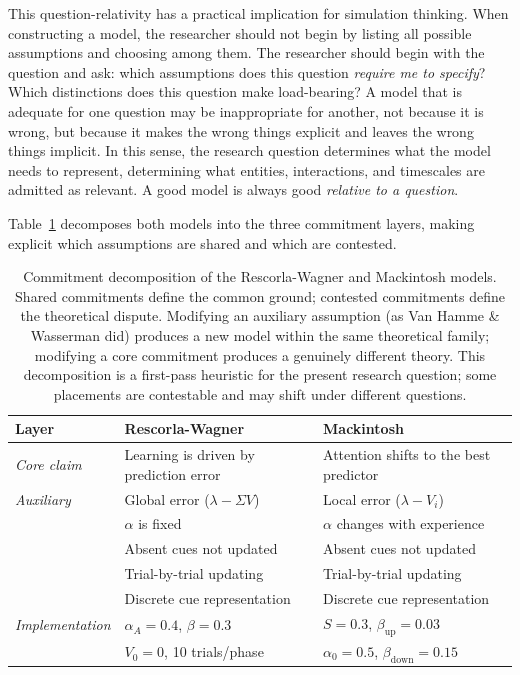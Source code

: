 \documentclass[fleqn,10pt]{wlscirep}
\begin{document}
\begin{linenumbers}
This question-relativity has a practical implication for simulation thinking. When constructing a model, the researcher should not begin by listing all possible assumptions and choosing among them. The researcher should begin with the question and ask: which assumptions does this question \emph{require me to specify}? Which distinctions does this question make load-bearing? A model that is adequate for one question may be inappropriate for another, not because it is wrong, but because it makes the wrong things explicit and leaves the wrong things implicit. In this sense, the research question determines what the model needs to represent, determining what entities, interactions, and timescales are admitted as relevant. A good model is always good \emph{relative to a question}.

Table~\ref{tab:commitments} decomposes both models into the three commitment layers, making explicit which assumptions are shared and which are contested.

\begin{table}[t]
\centering
\small
\caption{Commitment decomposition of the Rescorla-Wagner and Mackintosh models. Shared commitments define the common ground; contested commitments define the theoretical dispute. Modifying an auxiliary assumption (as Van Hamme \& Wasserman did) produces a new model within the same theoretical family; modifying a core commitment produces a genuinely different theory. This decomposition is a first-pass heuristic for the present research question; some placements are contestable and may shift under different questions.}
\label{tab:commitments}
\begin{tabular}{p{2.5cm}p{4.5cm}p{4.5cm}}
\toprule
\textbf{Layer} & \textbf{Rescorla-Wagner} & \textbf{Mackintosh} \\
\midrule
\emph{Core claim} & Learning is driven by prediction error & Attention shifts to the best predictor \\
\midrule
\emph{Auxiliary} & Global error ($\lambda - \Sigma V$) & Local error ($\lambda - V_i$) \\
 & $\alpha$ is fixed & $\alpha$ changes with experience \\
 & Absent cues not updated & Absent cues not updated \\
 & Trial-by-trial updating & Trial-by-trial updating \\
 & Discrete cue representation & Discrete cue representation \\
\midrule
\emph{Implementation} & $\alpha_A = 0.4$, $\beta = 0.3$ & $S = 0.3$, $\beta_{\text{up}} = 0.03$ \\
 & $V_0 = 0$, 10 trials/phase & $\alpha_0 = 0.5$, $\beta_{\text{down}} = 0.15$ \\
\bottomrule
\end{tabular}
\end{table}


\end{linenumbers}
\end{document}
